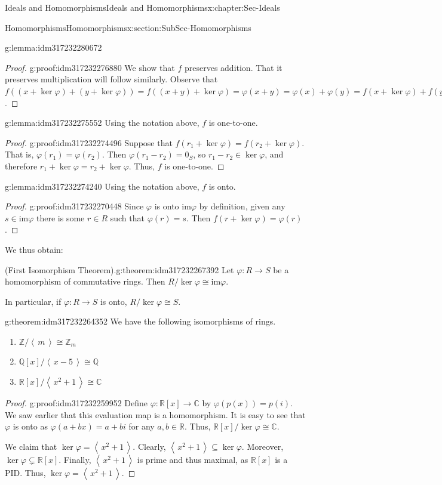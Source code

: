 \documentclass[oneside,10pt,]{book}
\numberwithin{equation}{section}
\newcommand{\ideal}[1]{\left\langle\, #1 \,\right\rangle}
\def\p{\varphi}
\def\im{\text{im}}
\def\C{{\mathbb C}}
\def\Z{{\mathbb Z}}
\def\Q{{\mathbb Q}}
\def\R{{\mathbb R}}
\begin{document}
\begin{chapterptx}{Ideals and Homomorphisms}{}{Ideals and Homomorphisms}{}{}{x:chapter:Sec-Ideals}
\begin{sectionptx}{Homomorphisms}{}{Homomorphisms}{}{}{x:section:SubSec-Homomorphisms}
\begin{lemma}{}{}{g:lemma:idm317232280672}
\end{lemma}
\begin{proof}{}{g:proof:idm317232276880}
We show that \(f\) preserves addition. That it preserves multiplication will follow similarly. Observe that \(f((x+\ker\p) + (y+\ker\p)) = f((x+y)+\ker\p) = \p(x+y) = \p(x)+\p(y) = f(x+\ker\p) + f(y+\ker\p)\).%
\end{proof}
\begin{lemma}{}{}{g:lemma:idm317232275552}%
Using the notation above, \(f\) is one-to-one.%
\end{lemma}
\begin{proof}{}{g:proof:idm317232274496}
Suppose that \(f(r_1 + \ker\p) = f(r_2 + \ker\p)\). That is, \(\p(r_1) = \p(r_2)\). Then \(\p(r_1 - r_2) = 0_S\), so \(r_1 -r_2 \in \ker\p\), and therefore \(r_1 + \ker\p = r_2 + \ker \p\). Thus, \(f\) is one-to-one.%
\end{proof}
\begin{lemma}{}{}{g:lemma:idm317232274240}%
Using the notation above, \(f\) is onto.%
\end{lemma}
\begin{proof}{}{g:proof:idm317232270448}
Since \(\p\) is onto \(\im \p\) by definition, given any \(s\in \im \p\) there is some \(r\in R\) such that \(\p(r) = s\). Then \(f(r+\ker\p) = \p(r)\).%
\end{proof}
We thus obtain:%
\begin{theorem}{(First Isomorphism Theorem).}{}{g:theorem:idm317232267392}%
Let \(\p : R\to S\) be a homomorphism of commutative rings. Then \(R/\ker \p \cong \im \p\).%
\par
In particular, if \(\p : R\to S\) is onto, \(R/\ker \p \cong S\).%
\end{theorem}
\begin{theorem}{}{}{g:theorem:idm317232264352}%
We have the following isomorphisms of rings.%
\begin{enumerate}
\item{}\(\Z/\ideal{m} \cong \Z_m\)%
\item{}\(\Q[x]/\ideal{x-5} \cong \Q\)%
\item{}\(\R[x]/\ideal{x^2+1} \cong \C\)%
\end{enumerate}
%
\end{theorem}
\begin{proof}{}{g:proof:idm317232259952}
Define \(\p: \R[x] \to \C\) by \(\p(p(x)) = p(i)\). We saw earlier that this evaluation map is a homomorphism. It is easy to see that \(\p\) is onto as \(\p(a+bx) = a+bi\) for any \(a,b\in \R\). Thus, \(\R[x]/\ker\p \cong \C\).%
\par
We claim that \(\ker\p = \ideal{x^2+1}\). Clearly, \(\ideal{x^2+1} \subseteq \ker\p\). Moreover, \(\ker\p \subsetneq \R[x]\). Finally, \(\ideal{x^2+1}\) is prime and thus maximal, as \(\R[x]\) is a PID. Thus, \(\ker\p = \ideal{x^2+1}\).%
\end{proof}
\end{sectionptx}
\end{chapterptx}
\end{document}
